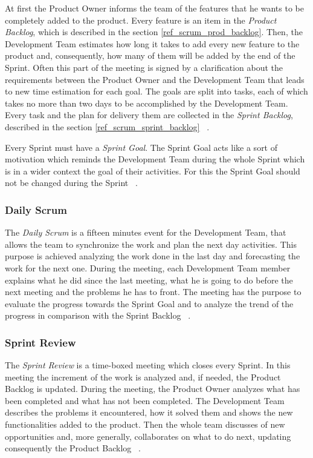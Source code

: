 			At first the Product Owner informs the team of the features that he wants to be completely added to the product. Every feature is an item in the \emph{Product Backlog}, which is described in the section \ref{ref_scrum_prod_backlog}. Then, the Development Team estimates how long it takes to add every new feature to the product and, consequently, how many of them will be added by the end of the Sprint. Often this part of the meeting is signed by a clarification about the requirements between the Product Owner and the Development Team that leads to new time estimation for each goal. The goals are split into tasks, each of which takes no more than two days to be accomplished by the Development Team. Every task and the plan for delivery them are collected in the \emph{Sprint Backlog}, described in the section \ref{ref_scrum_sprint_backlog} ~\cite{scrumEnglishGuide}.

			Every Sprint must have a \emph{Sprint Goal}. The Sprint Goal acts like a sort of motivation which reminds the Development Team during the whole Sprint which is in a wider context the goal of their activities. For this the Sprint Goal should not be changed during the Sprint ~\cite{scrumEnglishGuide}.
		
			\subsubsection{Daily Scrum}\label{ref_scrum_daily}
			The \emph{Daily Scrum} is a fifteen minutes event for the Development Team, that allows the team to synchronize the work and plan the next day activities. This purpose is achieved analyzing the work done in the last day and forecasting the work for the next one. 
			During the meeting, each Development Team member explains what he did since the last meeting, what he is going to do before the next meeting and the problems he has to front.
			The meeting has the purpose to evaluate the progress towards the Sprint Goal and to analyze the trend of the progress in comparison with the Sprint Backlog ~\cite{scrumEnglishGuide}. 

			\subsubsection{Sprint Review}\label{ref_scrum_sprint_rev}
			The \emph{Sprint Review} is a time-boxed meeting which closes every Sprint. In this meeting the increment of the work is analyzed and, if needed, the Product Backlog is updated. 
			During the meeting, the Product Owner analyzes what has been completed and what has not been completed. The Development Team describes the problems it encountered, how it solved them and shows the new functionalities added to the product. Then the whole team discusses of new opportunities and, more generally, collaborates on what to do next, updating consequently the Product Backlog ~\cite{scrumEnglishGuide}.			

